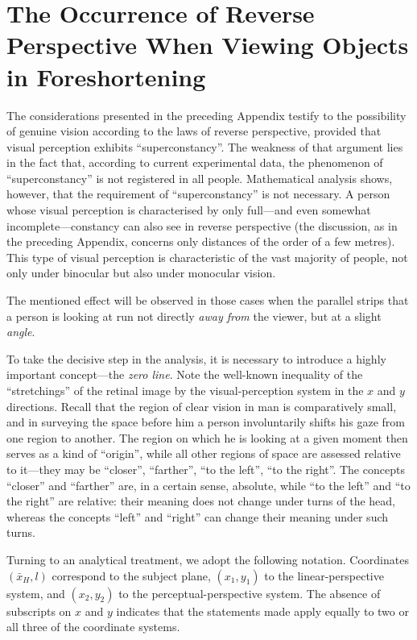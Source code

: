 
\chapter{The Occurrence of Reverse Perspective When Viewing Objects in Foreshortening}


The considerations presented in the preceding Appendix testify to the possibility of genuine
vision according to the laws of reverse perspective, provided that visual perception exhibits
``superconstancy''.  The weakness of that argument lies in the fact that, according to
current experimental data, the phenomenon of ``superconstancy'' is not registered in all
people.  Mathematical analysis shows, however, that the requirement of ``superconstancy''
is not necessary.  A person whose visual perception is characterised by only full---and even
somewhat incomplete---constancy can also see in reverse perspective (the discussion, as in
the preceding Appendix, concerns only distances of the order of a few metres).  This type
of visual perception is characteristic of the vast majority of people, not only under
binocular but also under monocular vision.

The mentioned effect will be observed in those cases when the parallel strips that a person
is looking at run not directly \emph{away from} the viewer, but at a slight \emph{angle}.

To take the decisive step in the analysis, it is necessary to introduce a highly important
concept---the \emph{zero line}.  Note the well-known inequality of the ``stretchings'' of
the retinal image by the visual-perception system in the $x$ and $y$ directions.  Recall
that the region of clear vision in man is comparatively small, and in surveying the space
before him a person involuntarily shifts his gaze from one region to another.  The region
on which he is looking at a given moment then serves as a kind of ``origin'', while all
other regions of space are assessed relative to it---they may be ``closer'', ``farther'',
``to the left'', ``to the right''.  The concepts ``closer'' and ``farther'' are, in a
certain sense, absolute, while ``to the left'' and ``to the right'' are relative: their
meaning does not change under turns of the head, whereas the concepts ``left'' and
``right'' can change their meaning under such turns.

Turning to an analytical treatment, we adopt the following notation.  Coordinates
$(\bar{x}_H, l)$ correspond to the subject plane, $(x_1, y_1)$ to the linear-perspective
system, and $(x_2, y_2)$ to the perceptual-perspective system.  The absence of subscripts
on $x$ and $y$ indicates that the statements made apply equally to two or all three of the
coordinate systems.

